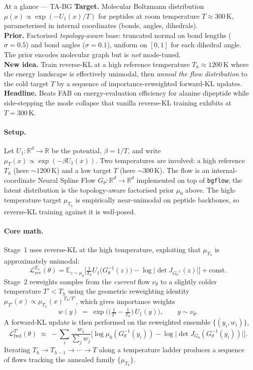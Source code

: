 \documentclass[11pt,letterpaper]{article}
\newcommand{\E}{\mathbb{E}}
\newcommand{\Real}{\mathbb{R}}
\theoremstyle{plain}
\begin{document}
\begin{methodbox}{At a glance --- TA-BG}
\textbf{Target.} Molecular Boltzmann distribution $\mu(x)\propto\exp(-U_1(x)/T)$
for peptides at room temperature $T\approx 300\,\mathrm K$, parameterised in
internal coordinates (bonds, angles, dihedrals). \\
\textbf{Prior.} Factorised \emph{topology-aware} base: truncated normal on bond
lengths ($\sigma=0.5$) and bond angles ($\sigma=0.1$), uniform on $[0,1]$ for
each dihedral angle. The prior encodes molecular graph but is \emph{not} mode-tuned. \\
\textbf{New idea.} Train reverse-KL at a high reference temperature
$T_h\approx 1200\,\mathrm K$ where the energy landscape is effectively
unimodal, then \emph{anneal the flow distribution} to the cold target $T$ by a
sequence of importance-reweighted forward-KL updates. \\
\textbf{Headline.} Beats FAB on energy-evaluation efficiency for alanine
dipeptide while side-stepping the mode collapse that vanilla reverse-KL
training exhibits at $T=300\,\mathrm K$.
\end{methodbox}

\paragraph{Setup.} Let $U_1:\Real^d\to\Real$ be the potential, $\beta=1/T$, and
write $\mu_T(x)\propto\exp(-\beta U_1(x))$. Two temperatures are involved: a
high reference $T_h$ (here $\sim 1200\,\mathrm K$) and a low target $T$ (here
$\sim 300\,\mathrm K$). The flow is an internal-coordinate Neural Spline Flow
$G_\theta:\Real^d\to\Real^d$ implemented on top of \texttt{bgflow}; the latent
distribution is the topology-aware factorised prior $\mu_0$ above. The
high-temperature target $\mu_{T_h}$ is empirically near-unimodal on peptide
backbones, so reverse-KL training against it is well-posed.

\paragraph{Core math.} Stage~1 uses reverse-KL at the high temperature,
exploiting that $\mu_{T_h}$ is approximately unimodal:
\[
  \mathcal L_{\mathrm{rev}}^{T_h}(\theta)
  = \E_{z\sim\mu_0}\!\Big[\tfrac{1}{T_h}U_1\!\big(G_\theta^{-1}(z)\big)
      - \log\big|\det J_{G_\theta^{-1}}(z)\big|\Big] + \mathrm{const}.
\]
Stage~2 reweights samples from the \emph{current} flow $\nu_\theta$ to a
slightly colder temperature $T'<T_h$ using the geometric reweighting identity
$\mu_{T'}(x)\propto\mu_{T_h}(x)^{T_h/T'}$, which gives importance weights
\[
  w(y) \;=\; \exp\!\Big(\big(\tfrac{1}{T'}-\tfrac{1}{T_h}\big)\,U_1(y)\Big),
  \qquad y\sim\nu_\theta.
\]
A forward-KL update is then performed on the reweighted ensemble
$\{(y_i,w_i)\}$,
\[
  \mathcal L_{\mathrm{fwd}}^{T'}(\theta)
  \;\approx\; -\sum_i \frac{w_i}{\sum_j w_j}
      \Big[\log\mu_0(G_\theta^{-1}(y_i)) - \log\big|\det J_{G_\theta}(G_\theta^{-1}(y_i))\big|\Big].
\]
Iterating $T_h\to T_{h-1}\to\cdots\to T$ along a temperature ladder produces a
sequence of flows tracking the annealed family $\{\mu_{T_k}\}$.
\end{document}

